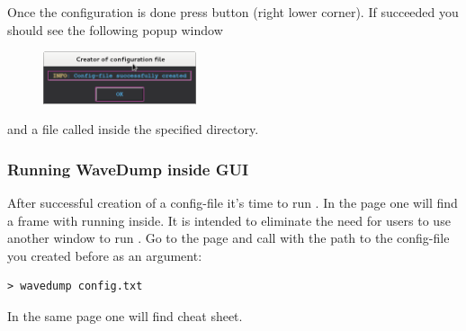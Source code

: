 Once the configuration is done press  
button (right lower corner). If succeeded you should see the following popup window
\begin{figure}[H]
    \centering
    \includegraphics[width=0.4\textwidth]{../pictures/documentation/gui/success.png}
\end{figure} 
\noindent and a file called  inside the specified directory.

\subsubsection{Running WaveDump inside GUI}
After successful creation of a config-file it's time to run .
In the  page one will find a frame with running  inside.
It is intended to eliminate the need for users to use another window to run .
Go to the  page and call  with the path to the config-file you
created before as an argument:
\begin{lstlisting}
> wavedump config.txt
\end{lstlisting}


In the same page one will find  cheat sheet.  

